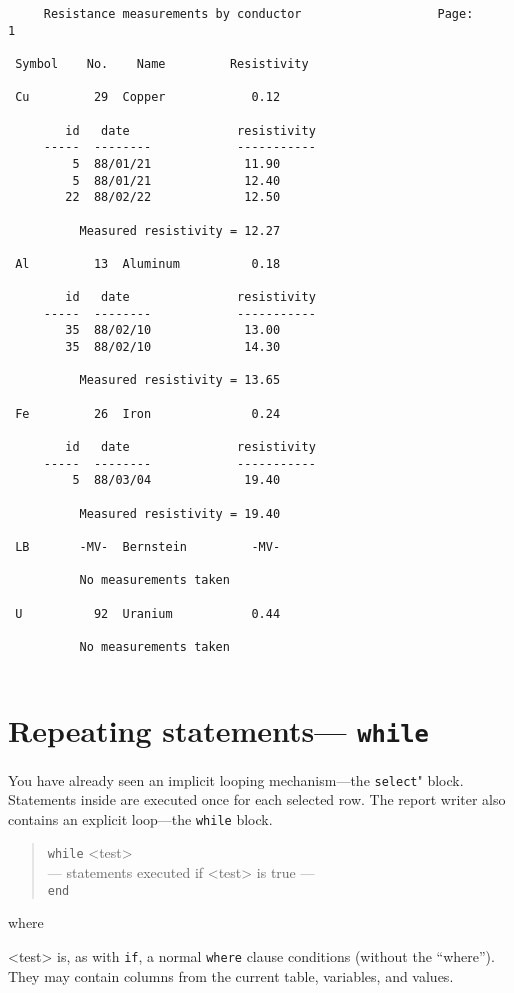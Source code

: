 \documentclass[11pt,a4paper]{report}
\begin{document}
\begin{verbatim}
     Resistance measurements by conductor                   Page:     1
 
 Symbol    No.    Name         Resistivity
 
 Cu         29  Copper            0.12
 
        id   date               resistivity
     -----  --------            -----------
         5  88/01/21             11.90
         5  88/01/21             12.40
        22  88/02/22             12.50
 
          Measured resistivity = 12.27
 
 Al         13  Aluminum          0.18
 
        id   date               resistivity
     -----  --------            -----------
        35  88/02/10             13.00
        35  88/02/10             14.30
 
          Measured resistivity = 13.65
 
 Fe         26  Iron              0.24
 
        id   date               resistivity
     -----  --------            -----------
         5  88/03/04             19.40
 
          Measured resistivity = 19.40
 
 LB       -MV-  Bernstein         -MV-
 
          No measurements taken
 
 U          92  Uranium           0.44
 
          No measurements taken
 
\end{verbatim}
 
\section{Repeating statements--- {\tt while}}
%
You have already seen an implicit looping mechanism---the \verb!select!"
block.  Statements inside are executed once for each selected row.
The report writer also contains an explicit loop---the \verb!while! block.
\begin{verse}
  \verb!while! <test>\\
  --- statements executed if <test> is true ---\\
  \verb!end! 
\end{verse}
where
\begin{List}
\item[<test>] is, as with \verb!if!, a normal
\verb!where! clause conditions (without the
``where'').  They may contain columns from the current table,
variables, and values.
\end{List}
 
\end{document}
